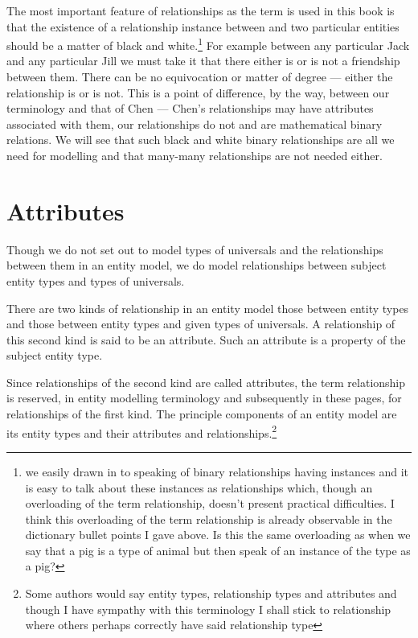 \mynote The most important feature of relationships as the term is used  in this book is that the existence of a relationship instance between and two particular entities should be a matter of black and white.\footnote{we easily drawn in to speaking of binary relationships having instances and it is easy to talk about these instances as relationships which, though an overloading of the term relationship, doesn't present practical difficulties.
I think this overloading of the term relationship is already observable in the dictionary bullet points I gave above. Is this the same overloading as when we say that a pig is a type of animal but then speak of an instance of the type as a pig?} For example between any particular Jack and any particular Jill we must take it that there either is or is not a friendship between them. There can be no equivocation or matter of degree --- either the relationship is or is not. This is a point of difference, by the way, between our terminology and that of Chen --- Chen's relationships may have attributes associated with them, our relationships do not and are mathematical binary relations. We will see that such black and white binary relationships are all we need for modelling and that many-many relationships are not needed either. 

\section{Attributes}
\mynote Though we do not set out to model types of universals and the relationships between them 
in an entity model, we do model relationships between subject entity types and types of universals. 

\mynote 
There are two kinds of relationship 
in an entity model those between entity types and those between 
entity types and  given types of universals. 
A relationship of this second kind is said to be an attribute. Such an attribute is a property of the subject entity type. 

\mynote Since relationships of the second kind are called attributes, the term relationship is reserved, in entity modelling terminology and subsequently in these pages, for relationships of the first kind.  The principle components of an entity model are its entity types and their attributes and relationships.\footnote{Some authors would say entity types, relationship types and attributes and though I have sympathy with this terminology I shall stick to relationship where others perhaps correctly have said relationship type}


